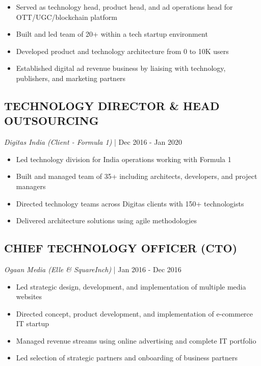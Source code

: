\documentclass[a4paper,11pt]{article}
\newcommand{\workperiod}[2]{{\small \textit{#1} | #2}}
\begin{document}
\begin{itemize}[leftmargin=*]
    \item Served as technology head, product head, and ad operations head for OTT/UGC/blockchain platform
    \item Built and led team of 20+ within a tech startup environment
    \item Developed product and technology architecture from 0 to 10K users
    \item Established digital ad revenue business by liaising with technology, publishers, and marketing partners
\end{itemize}

\subsection{TECHNOLOGY DIRECTOR \& HEAD OUTSOURCING}
\workperiod{Digitas India (Client - Formula 1)}{Dec 2016 - Jan 2020}

\begin{itemize}[leftmargin=*]
    \item Led technology division for India operations working with Formula 1
    \item Built and managed team of 35+ including architects, developers, and project managers
    \item Directed technology teams across Digitas clients with 150+ technologists
    \item Delivered architecture solutions using agile methodologies
\end{itemize}

\subsection{CHIEF TECHNOLOGY OFFICER (CTO)}
\workperiod{Ogaan Media (Elle \& SquareInch)}{Jan 2016 - Dec 2016}

\begin{itemize}[leftmargin=*]
    \item Led strategic design, development, and implementation of multiple media websites
    \item Directed concept, product development, and implementation of e-commerce IT startup
    \item Managed revenue streams using online advertising and complete IT portfolio
    \item Led selection of strategic partners and onboarding of business partners
\end{itemize}
\end{document}
